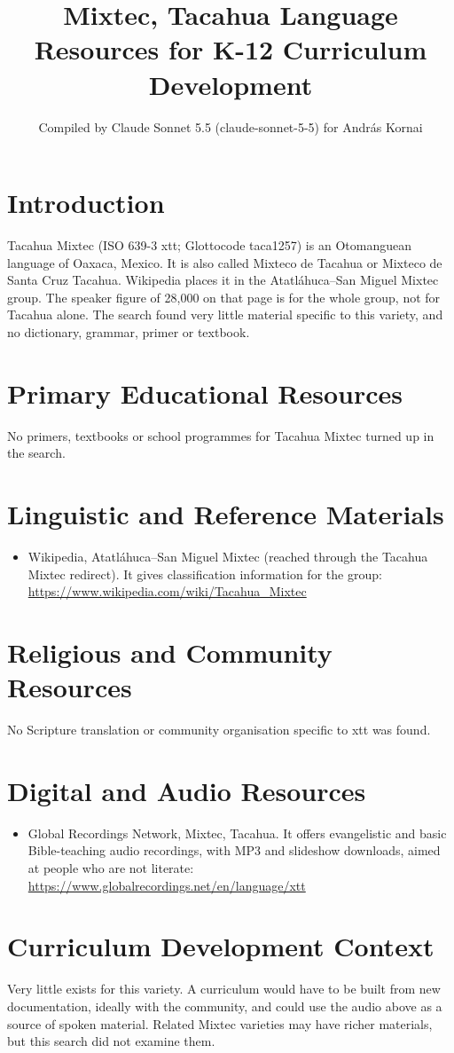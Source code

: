 \documentclass[12pt]{article}
\title{Mixtec, Tacahua Language Resources for K-12 Curriculum Development}
\author{Compiled by Claude Sonnet 5.5 (claude-sonnet-5-5) for Andr\'as Kornai}
\date{}
\begin{document}
\maketitle

\section{Introduction}
Tacahua Mixtec (ISO 639-3 xtt; Glottocode taca1257) is an Otomanguean language of Oaxaca, Mexico. It is also called Mixteco de Tacahua or Mixteco de Santa Cruz Tacahua. Wikipedia places it in the Atatl\'ahuca--San Miguel Mixtec group. The speaker figure of 28,000 on that page is for the whole group, not for Tacahua alone. The search found very little material specific to this variety, and no dictionary, grammar, primer or textbook.

\section{Primary Educational Resources}
No primers, textbooks or school programmes for Tacahua Mixtec turned up in the search.

\section{Linguistic and Reference Materials}
\begin{itemize}
\item Wikipedia, Atatl\'ahuca--San Miguel Mixtec (reached through the Tacahua Mixtec redirect). It gives classification information for the group: \url{https://www.wikipedia.com/wiki/Tacahua_Mixtec}
\end{itemize}

\section{Religious and Community Resources}
No Scripture translation or community organisation specific to xtt was found.

\section{Digital and Audio Resources}
\begin{itemize}
\item Global Recordings Network, Mixtec, Tacahua. It offers evangelistic and basic Bible-teaching audio recordings, with MP3 and slideshow downloads, aimed at people who are not literate: \url{https://www.globalrecordings.net/en/language/xtt}
\end{itemize}

\section{Curriculum Development Context}
Very little exists for this variety. A curriculum would have to be built from new documentation, ideally with the community, and could use the audio above as a source of spoken material. Related Mixtec varieties may have richer materials, but this search did not examine them.
\end{document}
